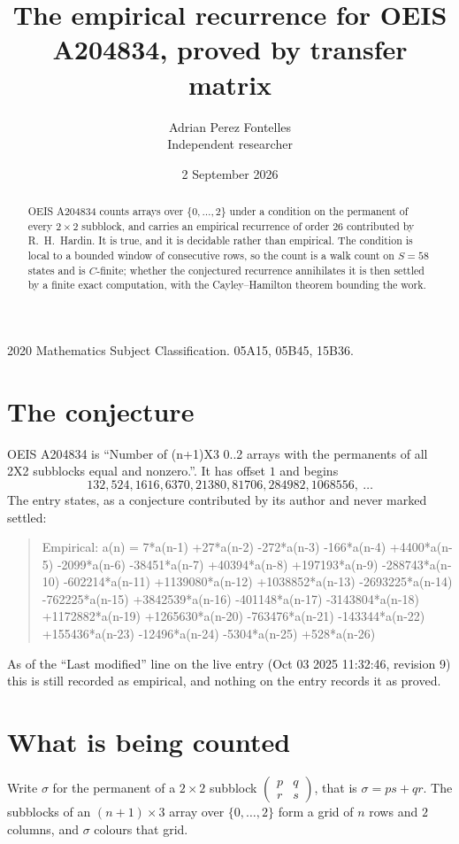 \documentclass[11pt,a4paper]{article}
\title{The empirical recurrence for OEIS A204834, proved by transfer matrix}
\author{Adrian Perez Fontelles\\ \small Independent researcher}
\date{2 September 2026}
\theoremstyle{plain}
\theoremstyle{definition}
\begin{document}
\maketitle

\begin{abstract}
OEIS A204834 counts arrays over $\{0,\dots,2\}$ under a condition on the permanent of every
$2\times2$ subblock, and carries an empirical recurrence of order $26$ contributed by
R.~H.~Hardin. It is true, and it is decidable rather than empirical. The condition is local to
a bounded window of consecutive rows, so the count is a walk count on $S=58$ states and is
$C$-finite; whether the conjectured recurrence annihilates it is then settled by a finite exact
computation, with the Cayley--Hamilton theorem bounding the work.
\end{abstract}

\noindent\small 2020 Mathematics Subject Classification. 05A15, 05B45, 15B36.\normalsize

\section{The conjecture}

OEIS A204834 is ``Number of (n+1)X3 0..2 arrays with the permanents of all 2X2 subblocks equal and nonzero.''. It has offset $1$ and begins
\[
132, 524, 1616, 6370, 21380, 81706, 284982, 1068556,\ \dots
\]
The entry states, as a conjecture contributed by its author and never marked settled:
\begin{quote}
Empirical: a(n) = 7*a(n-1) +27*a(n-2) -272*a(n-3) -166*a(n-4) +4400*a(n-5) -2099*a(n-6) -38451*a(n-7) +40394*a(n-8) +197193*a(n-9) -288743*a(n-10) -602214*a(n-11) +1139080*a(n-12) +1038852*a(n-13) -2693225*a(n-14) -762225*a(n-15) +3842539*a(n-16) -401148*a(n-17) -3143804*a(n-18) +1172882*a(n-19) +1265630*a(n-20) -763476*a(n-21) -143344*a(n-22) +155436*a(n-23) -12496*a(n-24) -5304*a(n-25) +528*a(n-26)
\end{quote}
As of the ``Last modified'' line on the live entry (Oct 03 2025 11:32:46, revision 9) this is still
recorded as empirical, and nothing on the entry records it as proved.

\section{What is being counted}

Write $\sigma$ for the permanent of a $2\times2$ subblock
$\begin{pmatrix}p&q\\r&s\end{pmatrix}$, that is $\sigma=ps+qr$. The subblocks of an
$(n+1)\times3$ array over $\{0,\dots,2\}$ form a grid of $n$ rows and $2$
columns, and $\sigma$ colours that grid.
\end{document}
